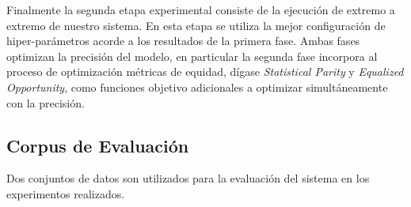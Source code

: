Finalmente la segunda etapa experimental consiste de la ejecución de extremo a extremo de nuestro sistema.
En esta etapa se utiliza la mejor configuración de hiper-parámetros acorde a los resultados de la primera fase.
Ambas fases optimizan la precisión del modelo, en particular la segunda fase incorpora al proceso de optimización métricas de equidad, dígase \emph{Statistical Parity} y \emph{Equalized Opportunity}, como funciones objetivo adicionales a optimizar simultáneamente con la precisión.

\subsection{Corpus de Evaluación}

Dos conjuntos de datos son utilizados para la evaluación del sistema en los experimentos realizados.

